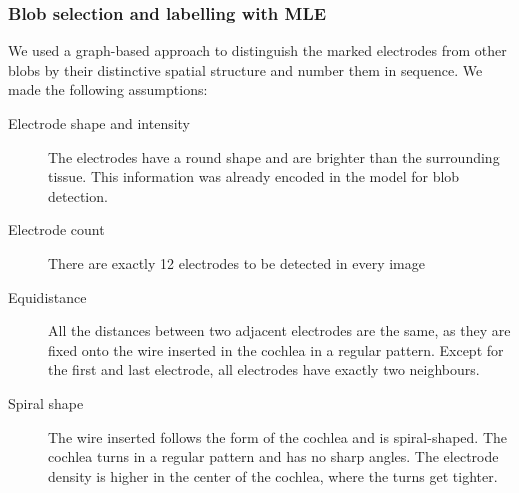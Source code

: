 \documentclass[a4paper, 10pt, twocolumn]{article}
\begin{document}
\subsubsection{Blob selection and labelling with MLE}
We used a graph-based approach to distinguish the marked electrodes from other blobs by their distinctive spatial structure and number them in sequence. We made the following assumptions:
\begin{description} %
\item[Electrode shape and intensity] The electrodes have a round shape and are brighter than the surrounding tissue. This information was already encoded in the model for blob detection.
\item[Electrode count] There are exactly 12 electrodes to be detected in every image
\item[Equidistance] All the distances between two adjacent electrodes are the same, as they are fixed onto the wire inserted in the cochlea in a regular pattern. Except for the first and last electrode, all electrodes have exactly two neighbours.
\item[Spiral shape] The wire inserted follows the form of the cochlea and is spiral-shaped. The cochlea turns in a regular pattern and has no sharp angles. The electrode density is higher in the center of the cochlea, where the turns get tighter.
\end{description}
\end{document}
